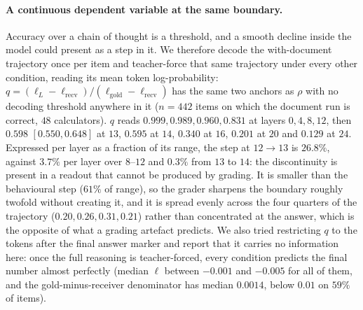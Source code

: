 \documentclass{article}
\begin{document}
\paragraph{A continuous dependent variable at the same boundary.} Accuracy over
a chain of thought is a threshold, and a smooth decline inside the model could
present as a step in it. We therefore decode the with-document trajectory once
per item and teacher-force that same trajectory under every other condition,
reading its mean token log-probability: $q = (\ell_L - \ell_{\text{recv}}) /
(\ell_{\text{gold}} - \ell_{\text{recv}})$ has the same two anchors as $\rho$
with no decoding threshold anywhere in it ($n=442$ items on which the document
run is correct, $48$ calculators). $q$ reads
$0.999, 0.989, 0.960, 0.831$ at layers $0,4,8,12$, then $0.598$
$[0.550,0.648]$ at $13$, $0.595$ at $14$, $0.340$ at $16$, $0.201$ at $20$ and
$0.129$ at $24$. Expressed per layer as a fraction of its range, the step at
$12\to13$ is $26.8\%$, against $3.7\%$ per layer over $8$--$12$ and $0.3\%$ from
$13$ to $14$: the discontinuity is present in a readout that cannot be produced
by grading. It is smaller than the behavioural step ($61\%$ of range), so the
grader sharpens the boundary roughly twofold without creating it, and it is
spread evenly across the four quarters of the trajectory ($0.20,0.26,0.31,0.21$)
rather than concentrated at the answer, which is the opposite of what a grading
artefact predicts. We also tried restricting $q$ to the tokens after the final
answer marker and report that it carries no information here: once the full
reasoning is teacher-forced, every condition predicts the final number almost
perfectly (median $\ell$ between $-0.001$ and $-0.005$ for all of them, and the
gold-minus-receiver denominator has median $0.0014$, below $0.01$ on $59\%$ of
items).
\end{document}
